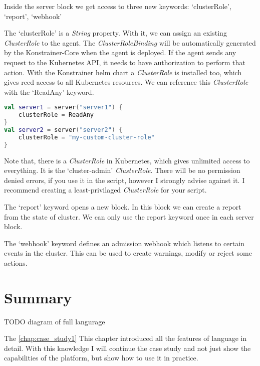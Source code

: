 Inside the server block we get access to three new keywords: `clusterRole', `report', `webhook'

The `clusterRole' is a \emph{String} property. With it, we can assign an existing \emph{ClusterRole} to the agent. The \emph{ClusterRoleBinding} will be automatically generated by the Konstrainer-Core when the agent is deployed. If the agent sends any request to the Kubernetes API, it needs to have authorization to perform that action. With the Konstrainer helm chart a \emph{ClusterRole} is installed too, which gives reed access to all Kubernetes resources. We can reference this \emph{ClusterRole} with the `ReadAny' keyword.

\begin{lstlisting}[caption={Usage of the clusterRole keyword},language=Kotlin,label=code:clusterrole_usage]
val server1 = server("server1") {
    clusterRole = ReadAny
}
val server2 = server("server2") {
    clusterRole = "my-custom-cluster-role"
}
\end{lstlisting}

Note that, there is a \emph{ClusterRole} in Kubernetes, which gives unlimited access to everything. It is the `cluster-admin' \emph{ClusterRole}. There will be no permission denied errors, if you use it in the script, however I strongly advise against it. I recommend creating a least-privilaged \emph{ClusterRole} for your script.

The `report' keyword opens a new block. In this block we can create a report from the state of cluster. We can only use the report keyword once in each server block.

The `webhook' keyword defines an admission webhook which listens to certain events in the cluster. This can be used to create warnings, modify or reject some actions.





\section{Summary}

TODO diagram of full langurage


The \ref{chap:case_study1}
This chapter introduced all the features of language in detail. With this knowledge I will continue the case study and not just show the capabilities of the platform, but show how to use it in practice.



